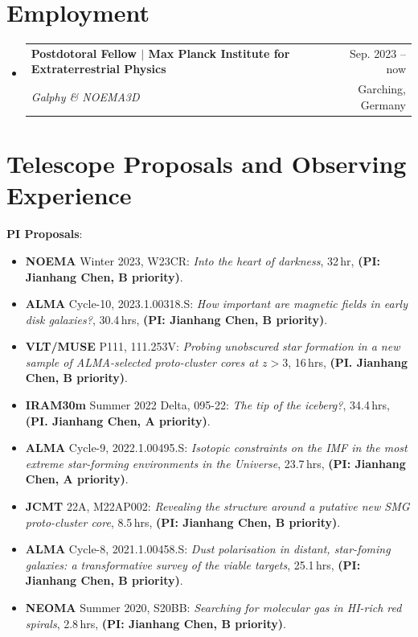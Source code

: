 \documentclass[A4,11pt]{article}
\makeatletter
\newcommand{\CVSubheading}[4]{
  \vspace{-2pt}\item
    \begin{tabular*}{0.97\textwidth}[t]{l@{\extracolsep{\fill}}r}
      \textbf{#1} & #2 \\
      \small#3 & \small #4 \\
    \end{tabular*}\vspace{-7pt}
}
\newcommand{\CVSubHeadingListStart}{\begin{itemize}[leftmargin=0.5cm, label={}]}
\newcommand{\CVSubHeadingListEnd}{\end{itemize}}
\newenvironment{paperlist}
{ \begin{itemize}[leftmargin=0.8cm, label={$\bullet$}]
    \setlength{\itemsep}{1pt}
    \setlength{\parskip}{1pt}
    \setlength{\parsep}{1pt}     }
{ \end{itemize}                  }
\makeatother
\begin{document}
\section{Employment}
  \CVSubHeadingListStart
    \CVSubheading
    {{Postdotoral Fellow $|$ {\small{Max Planck Institute for Extraterrestrial Physics}}}}{Sep. 2023 -- now}
     {\emph{Galphy \& NOEMA3D}}{Garching, Germany}
  \CVSubHeadingListEnd


\section{Telescope Proposals and Observing Experience}
{\bf PI Proposals}:\\
\vspace{-0.8em}
\begin{paperlist}
  \item {\bf NOEMA} Winter 2023, W23CR: \emph{Into the heart of darkness}, 32\,hr, {\bf (PI: Jianhang Chen, B priority)}.
  \item {\bf ALMA} Cycle-10, 2023.1.00318.S: \emph{How important are magnetic fields in early disk galaxies?}, 30.4\,hrs, {\bf (PI: Jianhang Chen, B priority)}. 
  \item {\bf VLT/MUSE} P111, 111.253V: \emph{Probing unobscured star formation in a new sample of ALMA-selected proto-cluster cores at $z>3$}, 16\,hrs, {\bf (PI. Jianhang Chen, B priority)}.
  \item {\bf IRAM30m} Summer 2022 Delta, 095-22: \emph{The tip of the iceberg?}, 34.4\,hrs, {\bf (PI. Jianhang Chen, A priority)}.
  \item {\bf ALMA} Cycle-9, 2022.1.00495.S: \emph{Isotopic constraints on the IMF in the most extreme star-forming environments in the Universe}, 23.7\,hrs, {\bf (PI: Jianhang Chen, A priority)}. 
  \item {\bf JCMT} 22A, M22AP002: \emph{Revealing the structure around a putative new SMG proto-cluster core}, 8.5\,hrs, {\bf (PI: Jianhang Chen, B priority)}.
  \item {\bf ALMA} Cycle-8, 2021.1.00458.S: \emph{Dust polarisation in distant, star-foming galaxies: a transformative survey of the viable targets}, 25.1\,hrs, {\bf (PI: Jianhang Chen, B priority)}. 
  \item {\bf NEOMA} Summer 2020, S20BB: \emph{Searching for molecular gas in HI-rich red spirals}, 2.8\,hrs, {\bf (PI: Jianhang Chen, B priority)}. 
\end{paperlist}
\end{document}

